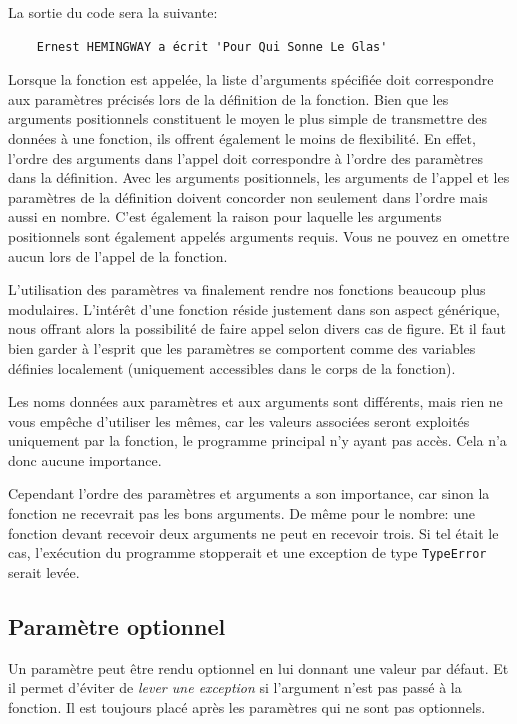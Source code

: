 \documentclass[a4paper,11pt]{book}
\begin{document}
La sortie du code sera la suivante:
\begin{verbatim}
    Ernest HEMINGWAY a écrit 'Pour Qui Sonne Le Glas'
\end{verbatim}
\medskip

Lorsque la fonction est appelée, la liste d'arguments spécifiée doit correspondre aux paramètres précisés lors de la définition de la fonction. Bien que les arguments positionnels constituent le moyen le plus simple de transmettre des données à une fonction, ils offrent également le moins de flexibilité. En effet, l'ordre des arguments dans l'appel doit correspondre à l'ordre des paramètres dans la définition. Avec les arguments positionnels, les arguments de l'appel et les paramètres de la définition doivent concorder non seulement dans l'ordre mais aussi en nombre. C'est également la raison pour laquelle les arguments positionnels sont également appelés arguments requis. Vous ne pouvez en omettre aucun lors de l'appel de la fonction.
\medskip

L'utilisation des paramètres va finalement rendre nos fonctions beaucoup plus modulaires. L'intérêt d'une fonction réside justement dans son aspect générique, nous offrant alors la possibilité de faire appel selon divers cas de figure. Et il faut bien garder à l'esprit que les paramètres se comportent comme des variables définies localement (uniquement accessibles dans le corps de la fonction).
\medskip

Les noms données aux paramètres et aux arguments sont différents, mais rien ne vous empêche d'utiliser les mêmes, car les valeurs associées seront exploités uniquement par la fonction, le programme principal n'y ayant pas accès. Cela n'a donc aucune importance.
\medskip

Cependant l'ordre des paramètres et arguments a son importance, car sinon la fonction ne recevrait pas les bons arguments. De même pour le nombre: une fonction devant recevoir deux arguments ne peut en recevoir trois. Si tel était le cas, l'exécution du programme stopperait et une exception de type \texttt{TypeError} serait levée. 
\medskip

\subsection*{Paramètre optionnel}
Un paramètre peut être rendu optionnel en lui donnant une valeur par défaut. Et il permet d'éviter de \textit{lever une exception} si l'argument n'est pas passé à la fonction. Il est toujours placé après les paramètres qui ne sont pas optionnels.
\medskip
\end{document}
